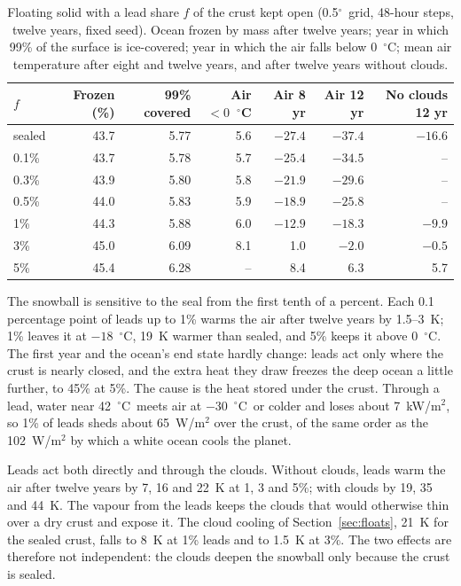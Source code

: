 \documentclass[11pt,a4paper]{article}
\newcommand{\degC}{$^{\circ}$C}
\newcommand{\degree}{$^{\circ}$}
\begin{document}
\begin{table}[htbp]
\centering\small
\caption{Floating solid with a lead share $f$ of the crust kept open (0.5\degree\ grid, 48-hour steps, twelve years, fixed seed). Ocean frozen by mass after twelve years; year in which 99\% of the surface is ice-covered; year in which the air falls below 0~\degC; mean air temperature after eight and twelve years, and after twelve years without clouds.}
\label{tab:leads}
\begin{tabular}{lrrrrrr}
\toprule
$f$ & Frozen (\%) & 99\% covered & Air $<0$~\degC & Air 8 yr & Air 12 yr & No clouds 12 yr \\
\midrule
sealed & 43.7 & 5.77 & 5.6 & $-27.4$ & $-37.4$ & $-16.6$ \\
0.1\% & 43.7 & 5.78 & 5.7 & $-25.4$ & $-34.5$ & -- \\
0.3\% & 43.9 & 5.80 & 5.8 & $-21.9$ & $-29.6$ & -- \\
0.5\% & 44.0 & 5.83 & 5.9 & $-18.9$ & $-25.8$ & -- \\
1\% & 44.3 & 5.88 & 6.0 & $-12.9$ & $-18.3$ & $-9.9$ \\
3\% & 45.0 & 6.09 & 8.1 & 1.0 & $-2.0$ & $-0.5$ \\
5\% & 45.4 & 6.28 & -- & 8.4 & 6.3 & 5.7 \\
\bottomrule
\end{tabular}
\end{table}

The snowball is sensitive to the seal from the first tenth of a percent. Each 0.1 percentage point of leads up to 1\% warms the air after twelve years by 1.5--3~K; 1\% leaves it at $-18$~\degC, 19~K warmer than sealed, and 5\% keeps it above 0~\degC. The first year and the ocean's end state hardly change: leads act only where the crust is nearly closed, and the extra heat they draw freezes the deep ocean a little further, to 45\% at 5\%. The cause is the heat stored under the crust. Through a lead, water near 42~\degC\ meets air at $-30$~\degC\ or colder and loses about 7~kW/m$^2$, so 1\% of leads sheds about 65~W/m$^2$ over the crust, of the same order as the 102~W/m$^2$ by which a white ocean cools the planet.

Leads act both directly and through the clouds. Without clouds, leads warm the air after twelve years by 7, 16 and 22~K at 1, 3 and 5\%; with clouds by 19, 35 and 44~K. The vapour from the leads keeps the clouds that would otherwise thin over a dry crust and expose it. The cloud cooling of Section~\ref{sec:floats}, 21~K for the sealed crust, falls to 8~K at 1\% leads and to 1.5~K at 3\%. The two effects are therefore not independent: the clouds deepen the snowball only because the crust is sealed.
\end{document}
